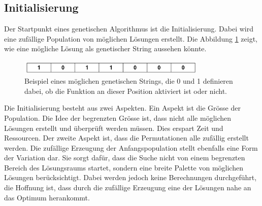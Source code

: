 %
%
%
%
\subsection{Initialisierung
\label{buch:paper:varalg:subsection:initialization}}
Der Startpunkt eines genetischen Algorithmus ist die Initialisierung.
Dabei wird eine zufällige Population von möglichen Lösungen erstellt.
Die Abbildung \ref{fig:possible_genetic_string} zeigt, wie eine mögliche
Lösung als genetischer String aussehen könnte.
\begin{figure}
	\centering
	\includegraphics[width=0.8\textwidth]{
        papers/varalg/images/teil3/01GeneticString.png
        }
	\caption{
		Beispiel eines möglichen genetischen Strings, die 0 und 1 definieren dabei,
		ob die Funktion an dieser Position aktiviert ist oder nicht.
		}
	\label{fig:possible_genetic_string}
\end{figure}
Die Initialisierung besteht aus zwei Aspekten. Ein Aspekt ist die Grösse
der Population. Die Idee der begrenzten Grösse ist, dass nicht alle möglichen
Lösungen erstellt und überprüft werden müssen. Dies erspart Zeit und Ressourcen.
Der zweite Aspekt ist, dass die Permutationen alle zufällig erstellt werden.
Die zufällige Erzeugung der Anfangspopulation stellt ebenfalls eine Form 
der Variation dar. Sie sorgt dafür, dass die Suche nicht von einem begrenzten 
Bereich des Lösungsraums startet, sondern eine breite Palette von möglichen 
Lösungen berücksichtigt. Dabei werden jedoch keine Berechnungen durchgeführt,
die Hoffnung ist, dass durch die zufällige Erzeugung eine der Lösungen nahe
an das Optimum herankommt.

